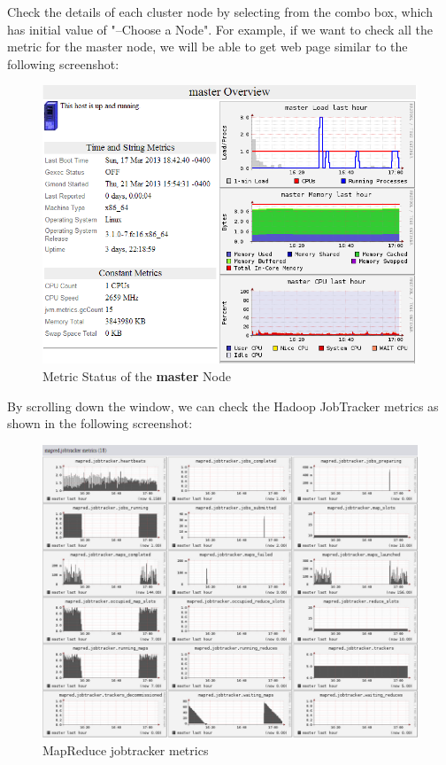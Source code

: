 Check the details of each cluster node by selecting from the combo box, which has initial value of "--Choose a Node". For example, if we want to check all the metric for the master node, we will be able to get web page similar to the following screenshot: \\
\begin{figure}[h]
  \centering
  \includegraphics[width=.8\textwidth]{figs/5163os_06_11.png}
  \caption{Metric Status of the \textbf{master} Node}\label{fig:master.status}
\end{figure} 

By scrolling down the window, we can check the Hadoop JobTracker metrics as shown in the following screenshot: \\
\begin{figure}[h]
  \centering
  \includegraphics[width=.8\textwidth]{figs/5163os_06_12.png}
  \caption{MapReduce jobtracker metrics}\label{fig:jobtracker.metrics}
\end{figure} 

